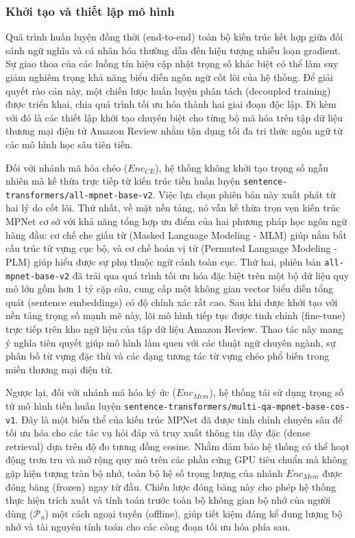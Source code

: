 \subsubsection*{Khởi tạo và thiết lập mô hình}

Quá trình huấn luyện đồng thời (end-to-end) toàn bộ kiến trúc kết hợp giữa đối sánh ngữ nghĩa và cá nhân hóa thường dẫn đến hiện tượng nhiễu loạn gradient. Sự giao thoa của các luồng tín hiệu cập nhật trọng số khác biệt có thể làm suy giảm nghiêm trọng khả năng biểu diễn ngôn ngữ cốt lõi của hệ thống. Để giải quyết rào cản này, một chiến lược huấn luyện phân tách (decoupled training) được triển khai, chia quá trình tối ưu hóa thành hai giai đoạn độc lập. Đi kèm với đó là các thiết lập khởi tạo chuyên biệt cho từng bộ mã hóa trên tập dữ liệu thương mại điện tử Amazon Review nhằm tận dụng tối đa tri thức ngôn ngữ từ các mô hình học sâu tiên tiến.

Đối với nhánh mã hóa chéo ($Enc_{CE}$), hệ thống không khởi tạo trọng số ngẫu nhiên mà kế thừa trực tiếp từ kiến trúc tiền huấn luyện \texttt{sentence-transformers/all-mpnet-base-v2}. Việc lựa chọn phiên bản này xuất phát từ hai lý do cốt lõi. Thứ nhất, về mặt nền tảng, nó vẫn kế thừa trọn vẹn kiến trúc MPNet cơ sở với khả năng tổng hợp ưu điểm của hai phương pháp học ngôn ngữ hàng đầu: cơ chế che giấu từ (Masked Language Modeling - MLM) giúp nắm bắt cấu trúc từ vựng cục bộ, và cơ chế hoán vị từ (Permuted Language Modeling - PLM) giúp hiểu được sự phụ thuộc ngữ cảnh toàn cục. Thứ hai, phiên bản \texttt{all-mpnet-base-v2} đã trải qua quá trình tối ưu hóa đặc biệt trên một bộ dữ liệu quy mô lớn gồm hơn 1 tỷ cặp câu, cung cấp một không gian vector biểu diễn tổng quát (sentence embeddings) có độ chính xác rất cao. Sau khi được khởi tạo với nền tảng trọng số mạnh mẽ này, lõi mô hình tiếp tục được tinh chỉnh (fine-tune) trực tiếp trên kho ngữ liệu của tập dữ liệu Amazon Review. Thao tác này mang ý nghĩa tiên quyết giúp mô hình làm quen với các thuật ngữ chuyên ngành, sự phân bố từ vựng đặc thù và các dạng tương tác từ vựng chéo phổ biến trong miền thương mại điện tử.

Ngược lại, đối với nhánh mã hóa ký ức ($Enc_{Mem}$), hệ thống tái sử dụng trọng số từ mô hình tiền huấn luyện \texttt{sentence-transformers/multi-qa-mpnet-base-cos-v1}. Đây là một biến thể của kiến trúc MPNet đã được tinh chỉnh chuyên sâu để tối ưu hóa cho các tác vụ hỏi đáp và truy xuất thông tin dày đặc (dense retrieval) dựa trên độ đo tương đồng cosine. Nhằm đảm bảo hệ thống có thể hoạt động trơn tru và mở rộng quy mô trên các phần cứng GPU tiêu chuẩn mà không gặp hiện tượng tràn bộ nhớ, toàn bộ hệ số trọng lượng của nhánh $Enc_{Mem}$ được đóng băng (frozen) ngay từ đầu. Chiến lược đóng băng này cho phép hệ thống thực hiện trích xuất và tính toán trước toàn bộ không gian bộ nhớ của người dùng ($\mathcal{P}_u$) một cách ngoại tuyến (offline), giúp tiết kiệm đáng kể dung lượng bộ nhớ và tài nguyên tính toán cho các công đoạn tối ưu hóa phía sau.

